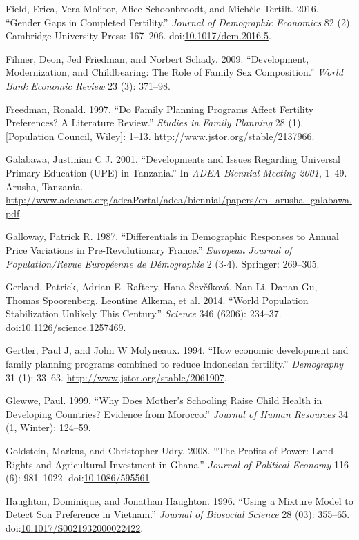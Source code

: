 \documentclass[]{article}
\begin{document}
Field, Erica, Vera Molitor, Alice Schoonbroodt, and Michèle Tertilt. 2016. ``Gender Gaps in Completed Fertility.'' \emph{Journal of Demographic Economics} 82 (2). Cambridge University Press: 167--206. doi:\href{https://doi.org/10.1017/dem.2016.5}{10.1017/dem.2016.5}.

Filmer, Deon, Jed Friedman, and Norbert Schady. 2009. ``Development, Modernization, and Childbearing: The Role of Family Sex Composition.'' \emph{World Bank Economic Review} 23 (3): 371--98.

Freedman, Ronald. 1997. ``Do Family Planning Programs Affect Fertility Preferences? A Literature Review.'' \emph{Studies in Family Planning} 28 (1). {[}Population Council, Wiley{]}: 1--13. \url{http://www.jstor.org/stable/2137966}.

Galabawa, Justinian C J. 2001. ``Developments and Issues Regarding Universal Primary Education (UPE) in Tanzania.'' In \emph{ADEA Biennial Meeting 2001}, 1--49. Arusha, Tanzania. \url{http://www.adeanet.org/adeaPortal/adea/biennial/papers/en_arusha_galabawa.pdf}.

Galloway, Patrick R. 1987. ``Differentials in Demographic Responses to Annual Price Variations in Pre-Revolutionary France.'' \emph{European Journal of Population/Revue Européenne de Démographie} 2 (3-4). Springer: 269--305.

Gerland, Patrick, Adrian E. Raftery, Hana Ševčíková, Nan Li, Danan Gu, Thomas Spoorenberg, Leontine Alkema, et al. 2014. ``World Population Stabilization Unlikely This Century.'' \emph{Science} 346 (6206): 234--37. doi:\href{https://doi.org/10.1126/science.1257469}{10.1126/science.1257469}.

Gertler, Paul J, and John W Molyneaux. 1994. ``How economic development and family planning programs combined to reduce Indonesian fertility.'' \emph{Demography} 31 (1): 33--63. \url{http://www.jstor.org/stable/2061907}.

Glewwe, Paul. 1999. ``Why Does Mother's Schooling Raise Child Health in Developing Countries? Evidence from Morocco.'' \emph{Journal of Human Resources} 34 (1, Winter): 124--59.

Goldstein, Markus, and Christopher Udry. 2008. ``The Profits of Power: Land Rights and Agricultural Investment in Ghana.'' \emph{Journal of Political Economy} 116 (6): 981--1022. doi:\href{https://doi.org/10.1086/595561}{10.1086/595561}.

Haughton, Dominique, and Jonathan Haughton. 1996. ``Using a Mixture Model to Detect Son Preference in Vietnam.'' \emph{Journal of Biosocial Science} 28 (03): 355--65. doi:\href{https://doi.org/10.1017/S0021932000022422}{10.1017/S0021932000022422}.
\end{document}
